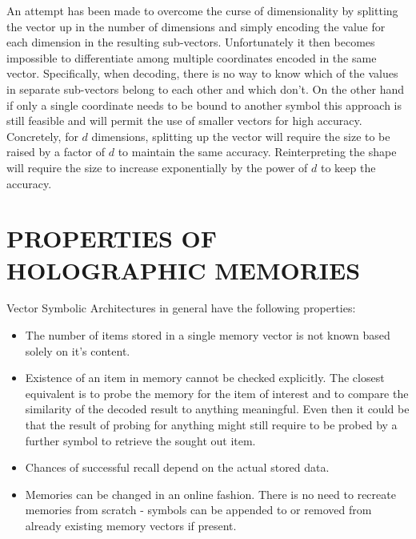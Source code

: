 \documentclass[a4paper,twoside]{article}
\begin{document}
		An attempt has been made to overcome the curse of dimensionality by splitting the vector up in the number of dimensions and simply encoding the value for each dimension in the resulting sub-vectors. Unfortunately it then becomes impossible to differentiate among multiple coordinates encoded in the same vector. Specifically, when decoding, there is no way to know which of the values in separate sub-vectors belong to each other and which don't. On the other hand if only a single coordinate needs to be bound to another symbol this approach is still feasible and will permit the use of smaller vectors for high accuracy. Concretely, for $d$ dimensions, splitting up the vector will require the size to be raised by a factor of $d$ to maintain the same accuracy. Reinterpreting the shape will require the size to increase exponentially by the power of $d$ to keep the accuracy.
			
	\section{PROPERTIES OF HOLOGRAPHIC MEMORIES}
	
	Vector Symbolic Architectures in general have the following properties:
	\begin{itemize}
		\item The number of items stored in a single memory vector is not known based solely on it's content.
		\item Existence of an item in memory cannot be checked explicitly. The closest equivalent is to probe the memory for the item of interest and to compare the similarity of the decoded result to anything meaningful. Even then it could be that the result of probing for anything might still require to be probed by a further symbol to retrieve the sought out item.
		\item Chances of successful recall depend on the actual stored data.
		\item Memories can be changed in an online fashion. There is no need to recreate memories from scratch - symbols can be appended to or removed from already existing memory vectors if present.
	\end{itemize}
	
\end{document}
